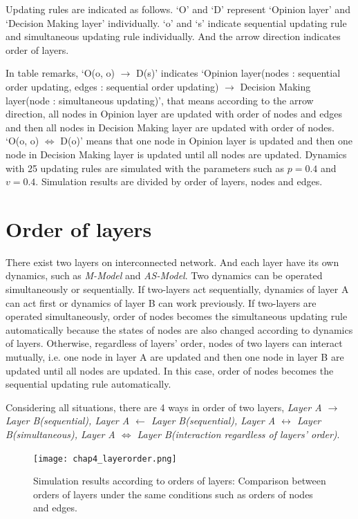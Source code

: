 Updating rules are indicated as follows. `O' and `D'  represent `Opinion layer' and `Decision Making layer' individually. `o' and `s' indicate sequential updating rule and simultaneous updating rule individually. And the arrow direction indicates order of layers.

In table remarks, `O(o, o) $\to$ D(s)' indicates `Opinion layer(nodes : sequential order updating, edges : sequential order updating) $\to$ Decision Making layer(node : simultaneous updating)', that means according to the arrow direction, all nodes in Opinion layer are updated with order of nodes and edges and then all nodes in Decision Making layer are updated with order of nodes. `O(o, o) $\Leftrightarrow$ D(o)' means that one node in Opinion layer is updated and then one node in Decision Making layer is updated until all nodes are updated. Dynamics with 25 updating rules are simulated with the parameters such as $p=0.4$ and $v=0.4$. Simulation results are divided by order of layers, nodes and edges. \\

\section{Order of layers}
There exist two layers on interconnected network. And each layer have its own dynamics, such as \textit{M-Model} and \textit{AS-Model}. Two dynamics can be operated simultaneously or sequentially. If two-layers act sequentially, dynamics of layer A can act first or dynamics of layer B can work previously. If two-layers are operated simultaneously, order of nodes becomes the simultaneous updating rule automatically because the states of nodes are also changed according to dynamics of layers. Otherwise, regardless of layers' order, nodes of two layers can interact mutually, i.e. one node in layer A are updated and then one node in layer B are updated until all nodes are updated. In this case, order of nodes becomes the sequential updating rule automatically.

Considering all situations, there are 4 ways in order of two layers, \textit{Layer A $\to$ Layer B(sequential), Layer A $\leftarrow$ Layer B(sequential), Layer A $\leftrightarrow$ Layer B(simultaneous), Layer A $\Leftrightarrow$ Layer B(interaction regardless of layers' order)}. 

\begin{figure}[!htb]
	\centering
	\texttt{[image: chap4\_layerorder.png]}
	\caption{Simulation results according to orders of layers: Comparison between orders of layers under the same conditions such as orders of nodes and edges.}
	\label{chap4_layerorder}
\end{figure}

